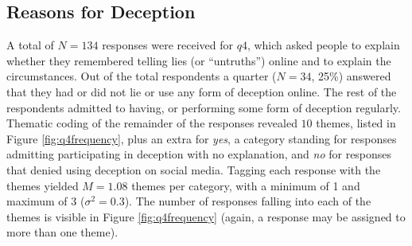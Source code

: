 \documentclass{sig-alternate}
\begin{document}
\subsection{Reasons for Deception} \label{sec:reasons}

A total of $N=134$ responses were received for $q4$, which asked people to explain whether they remembered telling lies (or ``untruths'') online and to explain the circumstances.  Out of the total respondents a quarter ($N=34$, 25\%) answered that they had or did not lie or use any form of deception online. The rest of the respondents admitted to having, or performing some form of deception regularly.  Thematic coding of the remainder of the responses revealed $10$ themes, listed in Figure \ref{fig:q4frequency}, plus an extra for \emph{yes}, a category standing for responses admitting participating in deception with no explanation, and \emph{no} for responses that denied using deception on social media. Tagging each response with the themes yielded $M=1.08$ themes per category, with a minimum of 1 and maximum of 3 ($\sigma^2=0.3$).  The number of responses falling into each of the themes is visible in Figure \ref{fig:q4frequency} (again, a response may be assigned to more than one theme).
\end{document}
